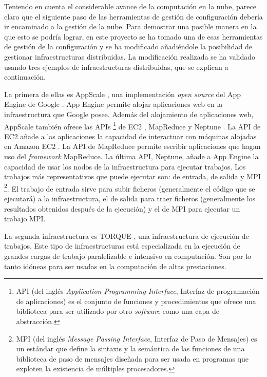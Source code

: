 Teniendo en cuenta el considerable avance de la computación en la nube, parece claro que el siguiente paso de las herramientas de gestión de configuración debería ir encaminado a la gestión de la nube. Para demostrar una posible manera en la que esto se podría lograr, en este proyecto se ha tomado una de esas herramientas de gestión de la configuración y se ha modificado añadiéndole la posibilidad de gestionar infraestructuras distribuidas. La modificación realizada se ha validado usando tres ejemplos de infraestructuras distribuidas, que se explican a continuación.

La primera de ellas es AppScale \cite{appscale}, una implementación \emph{open source} del App Engine de Google \cite{appengine}. App Engine permite alojar aplicaciones web en la infraestructura que Google posee. Además del alojamiento de aplicaciones web, AppScale también ofrece las APIs \footnote[1]{API (del inglés \emph{Application Programming Interface}, Interfaz de programación de aplicaciones) es el conjunto de funciones y procedimientos que ofrece una biblioteca para ser utilizado por otro \emph{software} como una capa de abstracción.} de EC2 \cite{appscale-ec2}, MapReduce \cite{appscale-mapreduce} y Neptune \cite{appscale-neptune}. La API de EC2 añade a las aplicaciones la capacidad de interactuar con máquinas alojadas en Amazon EC2 \cite{amazon-ec2}. La API de MapReduce permite escribir aplicaciones que hagan uso del \emph{framework} MapReduce. La última API, Neptune, añade a App Engine la capacidad de usar los nodos de la infraestructura para ejecutar trabajos. Los trabajos más representativos que puede ejecutar son: de entrada, de salida y MPI \footnote[2]{MPI (del inglés \emph{Message Passing Interface}, Interfaz de Paso de Mensajes) es un estándar que define la sintaxis y la semántica de las funciones de una biblioteca de paso de mensajes diseñada para ser usada en programas que exploten la existencia de múltiples procesadores.}. El trabajo de entrada sirve para subir ficheros (generalmente el código que se ejecutará) a la infraestructura, el de salida para traer ficheros (generalmente los resultados obtenidos después de la ejecución) y el de MPI para ejecutar un trabajo MPI.

La segunda infraestructura es TORQUE \cite{Staples:2006:TRM:1188455.1188464, torque}, una infraestructura de ejecución de trabajos. Este tipo de infraestructuras está especializada en la ejecución de grandes cargas de trabajo paralelizable e intensivo en computación. Son por lo tanto idóneas para ser usadas en la computación de altas prestaciones.

